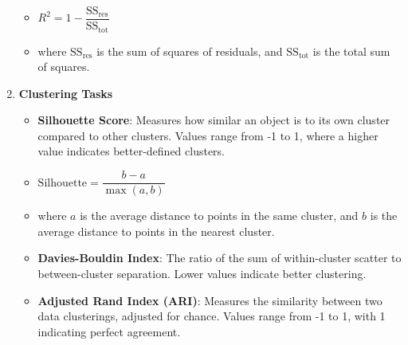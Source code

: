 \documentclass[a4paper, utf8]{ctexart}
\begin{document}
\begin{enumerate}
\begin{itemize}
	    	\item[] $R^2 = 1 - \dfrac{\text{SS}_{\text{res}}}{\text{SS}_{\text{tot}}}$
	    
	    	\item[] where \(\text{SS}_{\text{res}}\) is the sum of squares of residuals, and \(\text{SS}_{\text{tot}}\) is the total sum of squares.
		\end{itemize}
	
		\item \textbf{Clustering Tasks}
	
		\begin{itemize}
	    	\item \textbf{Silhouette Score}: Measures how similar an object is to its own cluster compared to other clusters. Values range from -1 to 1, where a higher value indicates better-defined clusters.
	    	
	    	\item[] $\text{Silhouette} = \dfrac{b - a}{\max(a, b)}$
	    	
	    	\item[] where \(a\) is the average distance to points in the same cluster, and \(b\) is the average distance to points in the nearest cluster.
	    	
	    	\item \textbf{Davies-Bouldin Index}: The ratio of the sum of within-cluster scatter to between-cluster separation. Lower values indicate better clustering.
	    	
	    	\item \textbf{Adjusted Rand Index (ARI)}: Measures the similarity between two data clusterings, adjusted for chance. Values range from -1 to 1, with 1 indicating perfect agreement.
		\end{itemize}
	\end{enumerate}
	
\end{document}
